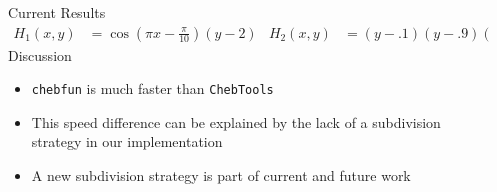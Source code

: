 \documentclass[final]{beamer}
\begin{document}
\begin{frame}{}
\begin{columns}[t]
\begin{column}{.31\linewidth}
\begin{block}{Current Results}
\begin{align*}
H_1(x,y) &= \cos\left(\pi x-\frac{\pi}{10}\right)(y-2) & H_2(x,y) &= (y-.1)(y-.9)(x-2)
\end{align*}
{\color{numhypRed} Discussion}
\begin{itemize}
\item {\tt chebfun} is much faster than {\tt ChebTools}
\item This speed difference can be explained by the lack of a subdivision strategy in our implementation
\item A new subdivision strategy is part of current and future work
\end{itemize}
\end{block}
\end{column}


  \begin{column}{.31\linewidth}

%




\end{column}
\end{columns}
\end{frame}
\end{document}
